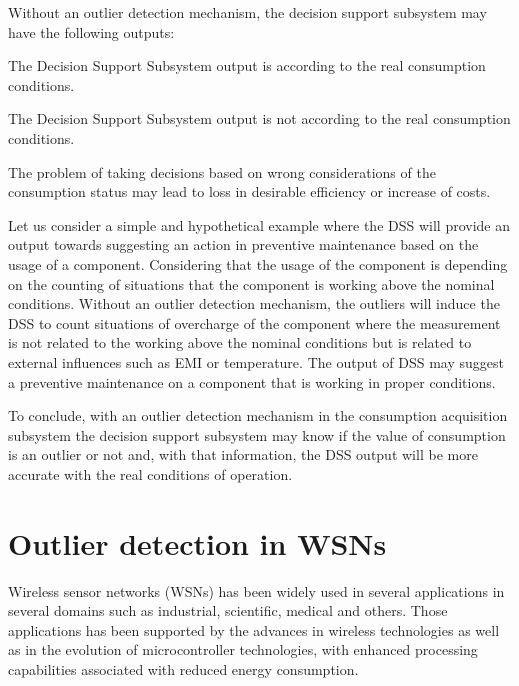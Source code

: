 \newpage
Without an outlier detection mechanism, the decision support subsystem may have the following outputs:


\begin{description}
	\setlength\itemsep{-0.5em}
	\item[Input deviation from real value lower than a threshold]
	The Decision Support Subsystem output is according to the real consumption conditions.
	\item[Input deviation from real value greater than a threshold]
	The Decision Support Subsystem output is not according to the real consumption conditions.	
\end{description}

The problem of taking decisions based on wrong considerations of the consumption status may lead to loss in desirable efficiency or increase of costs.

Let us consider a simple and hypothetical example where the DSS will provide an output towards suggesting an action in preventive maintenance based on the usage of a component. Considering that the usage of the component is depending on the counting of situations that the component is working above the nominal conditions. Without an outlier detection mechanism, the outliers will induce the DSS to count situations of overcharge of the component where the measurement is not related to the working above the nominal conditions but is related to external influences such as EMI or temperature. The output of DSS may suggest a preventive maintenance on a component that is working in proper conditions.

To conclude, with an outlier detection mechanism in the consumption acquisition subsystem the decision support subsystem may know if the value of consumption is an outlier or not and, with that information, the DSS output will be more accurate with the real conditions of operation.

\newpage
\section{Outlier detection in WSNs}

Wireless sensor networks (WSNs) has been widely used in several applications in several domains such as industrial, scientific, medical and others. Those applications has been supported by the advances in wireless technologies as well as in the evolution of microcontroller technologies, with enhanced processing capabilities associated with reduced energy consumption.

